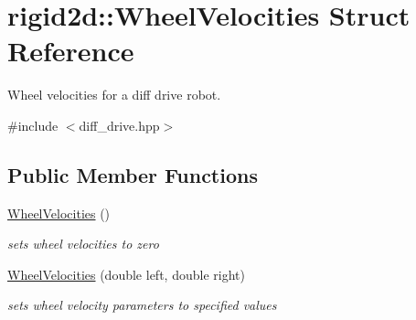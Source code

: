 \hypertarget{structrigid2d_1_1WheelVelocities}{}\section{rigid2d\+:\+:Wheel\+Velocities Struct Reference}
\label{structrigid2d_1_1WheelVelocities}


Wheel velocities for a diff drive robot.  




{\ttfamily \#include $<$diff\+\_\+drive.\+hpp$>$}

\subsection*{Public Member Functions}
\begin{DoxyCompactItemize}
\item 
\mbox{\label{structrigid2d_1_1WheelVelocities_a406eb6ddee2a8cfff2e88359462cd1c3}} 
\hyperlink{structrigid2d_1_1WheelVelocities_a406eb6ddee2a8cfff2e88359462cd1c3}{Wheel\+Velocities} ()
\begin{DoxyCompactList}\small\item\em sets wheel velocities to zero \end{DoxyCompactList}\item 
\mbox{\label{structrigid2d_1_1WheelVelocities_a580b7a8bfb68b61d5423adc3de5de4a9}} 
\hyperlink{structrigid2d_1_1WheelVelocities_a580b7a8bfb68b61d5423adc3de5de4a9}{Wheel\+Velocities} (double left, double right)
\begin{DoxyCompactList}\small\item\em sets wheel velocity parameters to specified values \end{DoxyCompactList}\end{DoxyCompactItemize}
